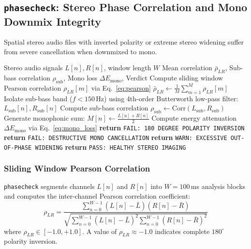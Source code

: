 \documentclass[10pt,journal,compsoc]{IEEEtran}
\begin{document}
\subsection{\texttt{phasecheck}: Stereo Phase Correlation and Mono Downmix Integrity}
Spatial stereo audio files with inverted polarity or extreme stereo widening suffer from severe cancellation when downmixed to mono.

\begin{algorithm}[t]
\caption{\texttt{phasecheck}: Stereo Phase and Downmix Loss}
\label{alg:phasecheck}
\begin{algorithmic}[1]
\REQUIRE Stereo audio signals $L[n], R[n]$, window length $W$
\ENSURE Mean correlation $\bar{\rho}_{LR}$, Sub-bass correlation $\rho_{\text{sub}}$, Mono loss $\Delta E_{\text{mono}}$, Verdict
\STATE Compute sliding window Pearson correlation $\rho_{LR}[m]$ via Eq.~\eqref{eq:pearson}
\STATE $\bar{\rho}_{LR} \leftarrow \frac{1}{M} \sum_{m=1}^M \rho_{LR}[m]$
\STATE Isolate sub-bass band ($f < 150$\,Hz) using 4th-order Butterworth low-pass filter: $L_{\text{sub}}[n], R_{\text{sub}}[n]$
\STATE Compute sub-bass correlation $\rho_{\text{sub}} \leftarrow \text{Corr}(L_{\text{sub}}, R_{\text{sub}})$
\STATE Generate monophonic sum: $M[n] \leftarrow \frac{L[n] + R[n]}{2}$
\STATE Compute energy attenuation $\Delta E_{\text{mono}}$ via Eq.~\eqref{eq:mono_loss}
    \STATE \textbf{return} \texttt{FAIL: 180 DEGREE POLARITY INVERSION}
    \STATE \textbf{return} \texttt{FAIL: DESTRUCTIVE MONO CANCELLATION}
    \STATE \textbf{return} \texttt{WARN: EXCESSIVE OUT-OF-PHASE WIDENING}
\ELSE
    \STATE \textbf{return} \texttt{PASS: HEALTHY STEREO IMAGING}
\ENDIF
\end{algorithmic}
\end{algorithm}

\subsubsection{Sliding Window Pearson Correlation}
\texttt{phasecheck} segments channels $L[n]$ and $R[n]$ into $W = 100$\,ms analysis blocks and computes the inter-channel Pearson correlation coefficient:
\begin{equation}
\rho_{LR} = \frac{\sum_{n=0}^{W-1} (L[n] - \bar{L})(R[n] - \bar{R})}{\sqrt{\sum_{n=0}^{W-1} (L[n] - \bar{L})^2 \sum_{n=0}^{W-1} (R[n] - \bar{R})^2}}
\label{eq:pearson}
\end{equation}
where $\rho_{LR} \in [-1.0, +1.0]$. A value of $\rho_{LR} \approx -1.0$ indicates complete $180^\circ$ polarity inversion.
\end{document}

